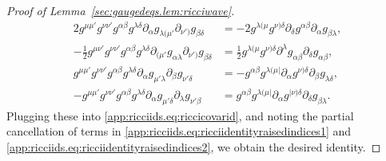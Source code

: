 \documentclass{article}
\newcommand{\pa}{\partial}
\begin{document}
\begin{proof}[Proof of Lemma~\ref{sec:gaugedeqs.lem:ricciwave}]
\begin{subequations}
\begin{align}
            2g^{\mu\mu'}g^{\nu\nu'}g^{\alpha\beta}g^{\lambda\delta}\pa_\alpha g_{\lambda(\mu'}\pa_{\nu')}g_{\beta\delta} &= -2g^{\lambda(\mu}g^{\nu)\delta}\pa_\delta g^{\alpha\beta}\pa_\alpha g_{\beta\lambda},\\
            - \frac{1}{2}g^{\mu\nu'}g^{\nu\nu'}g^{\alpha\beta}g^{\lambda\delta}\pa_{(\mu'}g_{\alpha\lambda}\pa_{\nu')}g_{\beta\delta} &= \frac{1}{2}g^{\lambda(\mu}g^{\nu)\delta}\pa^\lambda g_{\alpha\beta}\pa_\delta g_{\alpha\beta},\\
            g^{\mu\mu'}g^{\nu\nu'}g^{\alpha\beta}g^{\lambda\delta}\pa_\alpha g_{\mu'\lambda}\pa_\beta g_{\nu'\delta}  &= - g^{\alpha\beta}g^{\lambda(\mu|}\pa_\alpha g^{\nu)\delta}\pa_\beta g_{\lambda\delta},\label{app:ricciids.eq:ricciidentityraisedindices2}\\
            -g^{\mu\mu'}g^{\nu\nu'}g^{\alpha\beta}g^{\lambda\delta}\pa_\alpha g_{\mu'\delta}\pa_\lambda g_{\nu'\beta} &= 
            g^{\alpha\beta}g^{\lambda(\mu|}\pa_\alpha g^{|\nu)\delta}\pa_\delta g_{\beta\lambda}.
    \end{align}
    \end{subequations}
    Plugging these into \eqref{app:ricciids.eq:riccicovarid}, and noting the partial cancellation of terms in \eqref{app:ricciids.eq:ricciidentityraisedindices1} and \eqref{app:ricciids.eq:ricciidentityraisedindices2}, we obtain the desired identity.
\end{proof}
\footnotesize


\end{document}
